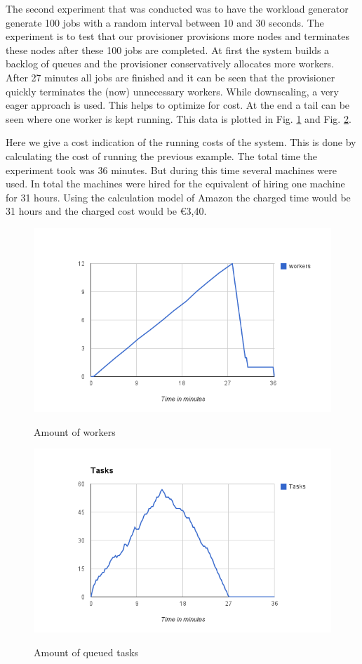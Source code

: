 \documentclass[a4paper]{IEEEtran}
\begin{document}
The second experiment that was conducted was to have the workload generator generate 100 jobs with a random interval between 10 and 30 seconds.
The experiment is to test that our provisioner provisions more nodes and terminates these nodes after these 100 jobs are completed.
At first the system builds a backlog of queues and the provisioner conservatively allocates more workers.
After 27 minutes all jobs are finished and it can be seen that the provisioner quickly terminates the (now) unnecessary workers.
While downscaling, a very eager approach is used.
This helps to optimize for cost.
At the end a tail can be seen where one worker is kept running.
This data is plotted in Fig. \ref{fig:100-workers} and Fig. \ref{fig:100-tasks}.

Here we give a cost indication of the running costs of the system. 
This is done by calculating the cost of running the previous example.
The total time the experiment took was 36 minutes.
But during this time several machines were used.
In total the machines were hired for the equivalent of hiring one machine for 31 hours.
Using the calculation model of Amazon the charged time would be 31 hours and the charged cost would be \euro 3,40.


\begin{figure}[ht]
	\includegraphics[scale=0.5]{fig/100workers.png}
	\label{fig:100-workers}
	\caption{Amount of workers}
\end{figure}

\begin{figure}[ht]
	\includegraphics[scale=0.5]{fig/100tasks.png}
	\label{fig:100-tasks}
	\caption{Amount of queued tasks}
\end{figure}
\end{document}
